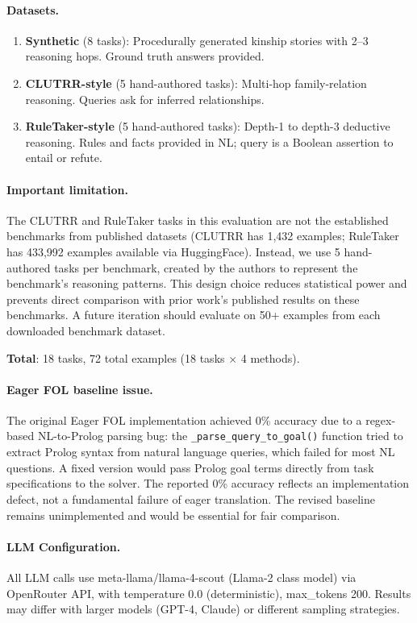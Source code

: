 \documentclass[11pt,letterpaper]{article}
\begin{document}
\paragraph{Datasets.}
\begin{enumerate}
  \item \textbf{Synthetic} (8 tasks): Procedurally generated kinship stories with 2--3 reasoning hops. Ground truth answers
    provided.
  \item \textbf{CLUTRR-style} (5 hand-authored tasks): Multi-hop family-relation reasoning. Queries ask for inferred
    relationships.
  \item \textbf{RuleTaker-style} (5 hand-authored tasks): Depth-1 to depth-3 deductive reasoning. Rules and facts provided
    in NL; query is a Boolean assertion to entail or refute.
\end{enumerate}

\paragraph{Important limitation.} The CLUTRR and RuleTaker tasks in this evaluation are not the established benchmarks from
published datasets (CLUTRR has 1,432 examples; RuleTaker has 433,992 examples available via HuggingFace). Instead, we use 5
hand-authored tasks per benchmark, created by the authors to represent the benchmark's reasoning patterns. This design choice
reduces statistical power and prevents direct comparison with prior work's published results on these benchmarks. A future
iteration should evaluate on 50+ examples from each downloaded benchmark dataset.

\textbf{Total}: 18 tasks, 72 total examples (18 tasks $\times$ 4 methods).

\paragraph{Eager FOL baseline issue.} The original Eager FOL implementation achieved 0\% accuracy due to a regex-based
NL-to-Prolog parsing bug: the \texttt{\_parse\_query\_to\_goal()} function tried to extract Prolog syntax from natural
language queries, which failed for most NL questions. A fixed version would pass Prolog goal terms directly from task
specifications to the solver. The reported 0\% accuracy reflects an implementation defect, not a fundamental failure of eager
translation. The revised baseline remains unimplemented and would be essential for fair comparison.

\paragraph{LLM Configuration.} All LLM calls use meta-llama/llama-4-scout (Llama-2 class model) via OpenRouter API, with
temperature 0.0 (deterministic), max\_tokens 200. Results may differ with larger models (GPT-4, Claude) or different
sampling strategies.
\end{document}
